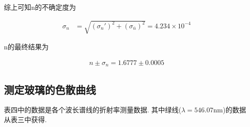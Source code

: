 \documentclass[a4paper,12pt,notitlepage]{article}
\begin{document}
	综上可知n的不确定度为
	
\begin{align*}
	\sigma_n &= \sqrt{(\sigma_n')^2 + (\sigma_{\bar{n}})^2} = 4.234 \times 10^{-4}
\end{align*}

	n的最终结果为
	
\begin{align*}
	n \pm \sigma_n = 1.6777 \pm 0.0005
\end{align*}

\subsection{测定玻璃的色散曲线}

	表四中的数据是各个波长谱线的折射率测量数据. 其中绿线($\lambda = 546.07$nm)的数据从表三中获得.
	
\end{document}
